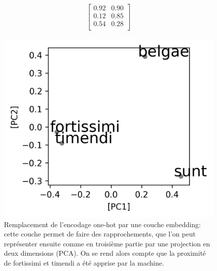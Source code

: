 \begin{figure}
\begin{minipage}{.32\linewidth}
\begin{equation*}
\begin{matrix}
            \begin{bmatrix}
            0.92 & 0.90 \\
            0.12 & 0.85 \\ 
            0.54 & 0.28 \\ 
            \end{bmatrix}
            
            \end{matrix}
        \end{equation*}
    \end{minipage}%
    \begin{minipage}{.32\linewidth}
            \centering
            \includegraphics[width=\linewidth]{results/deep-learning/explanations/visualisation_embedding.png}
    \end{minipage}%
    \caption{Remplacement de l'encodage one-hot par une couche  embedding: cette couche permet de faire des rapprochements, que l'on peut représenter ensuite comme en troisième partie par une projection en deux dimensions (PCA). On se rend alors compte que la proximité de fortissimi et timendi a été apprise par la machine.}
\end{figure}